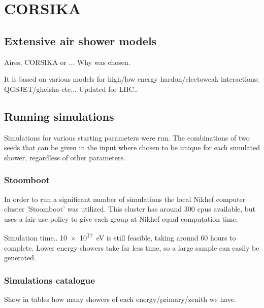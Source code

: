 \chapter{CORSIKA}
\label{ch:corsika}

\section{Extensive air shower models}

Aires, CORSIKA or ...
Why was \corsika chosen.

It is based on various models for high/low energy hardon/electoweak
interactions; QGSJET/gheisha etc... Updated for LHC..


\section{Running simulations}

Simulations for various starting parameters were run. The combinations
of two seeds that can be given in the input where chosen to be unique
for each simulated shower, regardless of other parameters.

\subsection{Stoomboot}

In order to run a significant number of simulations the local Nikhef
computer cluster 'Stoomboot' was utilized. This cluster has around 300
cpus available, but uses a fair-use policy to give each group at Nikhef
equal computation time.

Simulation time.. \SI{10e17}{\electronvolt} is still feasible, taking
around 60 hours to complete. Lower energy showers take far less time, so
a large sample can easily be generated.

\subsection{Simulations catalogue}

Show in tables how many showers of each energy/primary/zenith we have.
